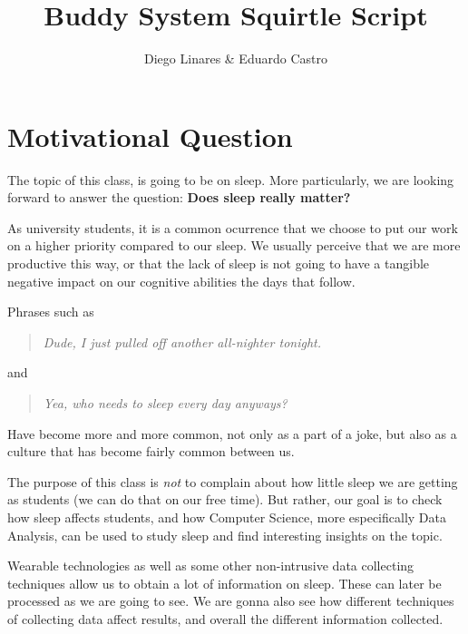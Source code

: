 \documentclass[]{IEEEtran}
\title{Buddy System Squirtle Script}
\author{Diego Linares \& Eduardo Castro}
\begin{document}
\maketitle

\section{Motivational Question}

The topic of this class, is going to be on sleep. More particularly, we are looking forward to answer the question: \textbf{Does sleep really matter?} \par 

As university students, it is a common ocurrence that we choose to put our work on a higher priority compared to our sleep. We usually perceive that we are more productive this way, or that the lack of sleep is not going to have a tangible negative impact on our cognitive abilities the days that follow. \par 

Phrases such as \par 

\begin{quotation}
    \textit{Dude, I just pulled off another all-nighter tonight.}
\end{quotation}

and \par 

\begin{quotation}
    \textit{Yea, who needs to sleep every day anyways?}
\end{quotation}

Have become more and more common, not only as a part of a joke, but also as a culture that has become fairly common between us. \par 

The purpose of this class is \textit{not} to complain about how little sleep we are getting as students (we can do that on our free time). But rather, our goal is to check how sleep affects students, and how Computer Science, more especifically Data Analysis, can be used to study sleep and find interesting insights on the topic. \par 

Wearable technologies as well as some other non-intrusive data collecting techniques allow us to obtain a lot of information on sleep. These can later be processed as we are going to see. We are gonna also see how different techniques of collecting data affect results, and overall the different information collected. \par 
\end{document}
